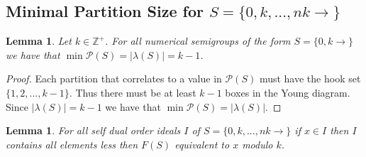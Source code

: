 \documentclass[11pt,letterpaper]{article}
\newtheorem{lem}[thm]{Lemma}
\theoremstyle{definition}
\newcommand{\Z}{\mathbb{Z}}
\begin{document}
\newpage

\begin{center}
    \section{Minimal Partition Size for $S=\{0,k,...,nk\rightarrow\}$}
\end{center}

\begin{lem}
    \label{n=1 case}
    Let $k\in\Z^+$. For all numerical semigroups of the form $S=\{0,k\rightarrow\}$ we have that $\min\mathcal{P}(S)=|\lambda(S)|=k-1$.
\end{lem}

\begin{proof}
    Each partition that correlates to a value in $\mathcal{P}(S)$ must have the hook set $\{1,2,...,k-1\}$. Thus there must be at least $k-1$ boxes in the Young diagram. Since $|\lambda (S)|=k-1$ we have that $\min\mathcal{P}(S)=|\lambda(S)|$.
\end{proof}






\begin{lem}
    \label{line poset lem}
    For all self dual order ideals $I$ of $S=\{0,k,...,nk\rightarrow\}$ if $x\in I$ then $I$ contains all elements less then $F(S)$ equivalent to $x$ modulo $k$.
\end{lem}
\end{document}
